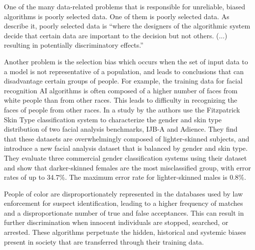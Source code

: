 \documentclass[
	12pt,
    a4paper,
    egregdoesnotlikesansseriftitles, %
    toc=chapterentrywithdots,
    oneside, openany,
    titlepage,
    parskip=half,
    headings=normal,  %
    listof=totoc,
    bibliography=totocnumbered,
    index=totoc,
    captions=tableheading,  %
    listof=flat,
    numbers=noenddot, %
    final]
    {scrbook}
\begin{document}
One of the many data-related problems that is responsible for unreliable, biased algorithms is poorly selected data.
One of them is poorly selected data. As \textcite[p. 7]{usa} describe it, poorly selected data is “where the designers of the algorithmic system decide that certain data are important to the decision but not others. (...) resulting in potentially discriminatory effects.”


Another problem is the selection bias which occurs when the set of input data to a model is not representative of a population, and leads to conclusions that can disadvantage certain groups of people. \cite[p. 8]{usa}
For example, the training data for facial recognition AI algorithms is often composed of a higher number of faces from white people than from other races. This leads to difficulty in recognizing the faces of people from other races.
In a study by \textcite{buolamwini_gender_2018} the authors use the Fitzpatrick Skin Type classification system to characterize the gender and skin type distribution of two facial analysis benchmarks, IJB-A and Adience. 
They find that these datasets are overwhelmingly composed of lighter-skinned subjects, and introduce a new facial analysis dataset that is balanced by gender and skin type. 
They evaluate three commercial gender classification systems using their dataset and show that darker-skinned females are the most misclassified group, with error rates of up to 34.7\%. 
The maximum error rate for lighter-skinned males is 0.8\%. 
\cite[p. 1]{buolamwini_gender_2018}


People of color are disproportionately represented in the databases used by law enforcement for suspect identification, leading to a higher frequency of matches and a disproportionate number of true and false acceptances. \cite[p. 323-324]{bacchini_race_2019}
This can result in further discrimination when innocent individuals are stopped, searched, or arrested. 
These algorithms perpetuate the hidden, historical and systemic biases present in society that are transferred through their training data. \cite[p. 8]{usa}
\end{document}
